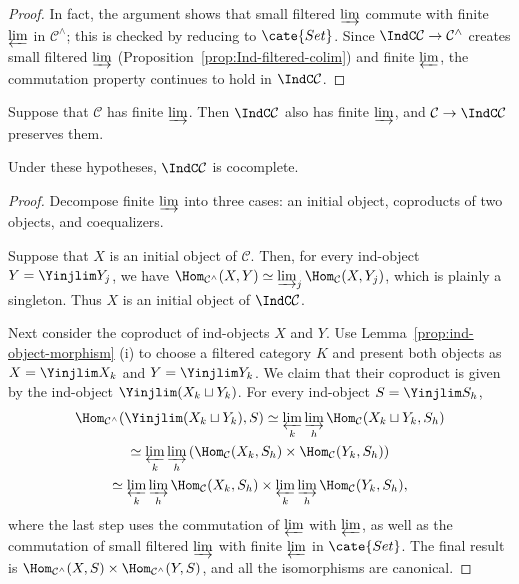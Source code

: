 \begin{proof}
	In fact, the argument shows that small filtered $\varinjlim$ commute with finite $\varprojlim$ in $\mathcal{C}^\wedge$; this is checked by reducing to $\cate{Set}$. Since $\IndC\mathcal{C}\to\mathcal{C}^\wedge$ creates small filtered $\varinjlim$ (Proposition~\ref{prop:Ind-filtered-colim}) and finite $\varprojlim$, the commutation property continues to hold in $\IndC\mathcal{C}$.
\end{proof}

\begin{lemma}\label{prop:Ind-colim}
	Suppose that $\mathcal{C}$ has finite $\varinjlim$. Then $\IndC\mathcal{C}$ also has finite $\varinjlim$, and $\mathcal{C}\to\IndC\mathcal{C}$ preserves them.

	Under these hypotheses, $\IndC\mathcal{C}$ is cocomplete.
\end{lemma}
\begin{proof}
	Decompose finite $\varinjlim$ into three cases: an initial object, coproducts of two objects, and coequalizers.

	Suppose that $X$ is an initial object of $\mathcal{C}$. Then, for every ind-object $Y=\Yinjlim Y_j$, we have $\Hom_{\mathcal{C}^\wedge}(X,Y)\simeq\varinjlim_j\Hom_{\mathcal{C}}(X,Y_j)$, which is plainly a singleton. Thus $X$ is an initial object of $\IndC\mathcal{C}$.

	Next consider the coproduct of ind-objects $X$ and $Y$. Use Lemma~\ref{prop:ind-object-morphism} (i) to choose a filtered category $K$ and present both objects as $X=\Yinjlim X_k$ and $Y=\Yinjlim Y_k$. We claim that their coproduct is given by the ind-object $\Yinjlim(X_k\sqcup Y_k)$. For every ind-object $S=\Yinjlim S_h$,
	\begin{multline*}
		\Hom_{\mathcal{C}^\wedge}(\Yinjlim (X_k \sqcup Y_k), S) \simeq \varprojlim_k \varinjlim_h \Hom_{\mathcal{C}}(X_k \sqcup Y_k, S_h) \\
		\simeq \varprojlim_k \varinjlim_h \left( \Hom_{\mathcal{C}}(X_k, S_h) \times \Hom_{\mathcal{C}}(Y_k, S_h) \right) \\
		\simeq \varprojlim_k \varinjlim_h \Hom_{\mathcal{C}}(X_k, S_h) \times \varprojlim_k \varinjlim_h \Hom_{\mathcal{C}}(Y_k, S_h),
	\end{multline*}
	where the last step uses the commutation of $\varprojlim$ with $\varprojlim$, as well as the commutation of small filtered $\varinjlim$ with finite $\varprojlim$ in $\cate{Set}$. The final result is $\Hom_{\mathcal{C}^\wedge}(X,S)\times\Hom_{\mathcal{C}^\wedge}(Y,S)$, and all the isomorphisms are canonical.


\end{proof}
